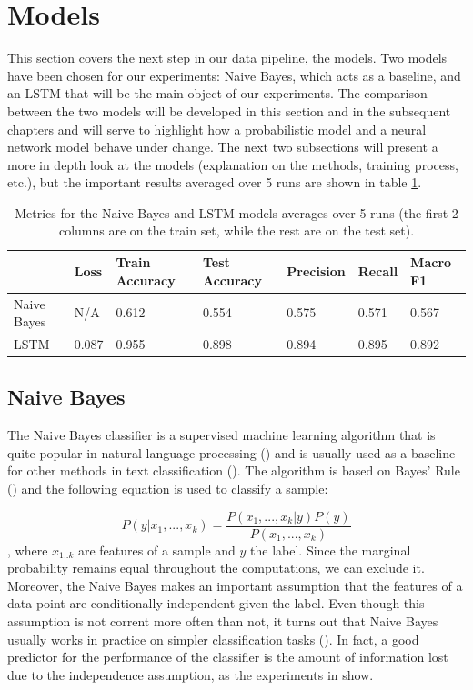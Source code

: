 \documentclass[12pt]{extreport}
\begin{document}
\section{Models} \label{sec:models}

This section covers the next step in our data pipeline, the models. Two models have been chosen for our experiments: Naive Bayes, which acts as a baseline, and an LSTM that will be the main object of our experiments. The comparison between the two models will be developed in this section and in the subsequent chapters and will serve to highlight how a probabilistic model and a neural network model behave under change. The next two subsections will present a more in depth look at the models (explanation on the methods, training process, etc.), but the important results averaged over 5 runs are shown in table \ref{table:model-metrics}.

\begin{table}[ht!]
\centering
\begin{tabular}{|l|l|l|l|l|l|l|}
\hline
            & Loss & Train Accuracy & Test Accuracy & Precision & Recall & Macro F1 \\ \hline
Naive Bayes & N/A        & 0.612          & 0.554         & 0.575          & 0.571       & 0.567         \\ \hline
LSTM        & 0.087      & 0.955          & 0.898         & 0.894          & 0.895       & 0.892         \\ \hline
\end{tabular}
\caption{Metrics for the Naive Bayes and LSTM models averages over 5 runs (the first 2 columns are on the train set, while the rest are on the test set).}
\label{table:model-metrics}
\end{table}

\subsection{Naive Bayes} \label{sec:nb}

The Naive Bayes classifier is a supervised machine learning algorithm that is quite popular in natural language processing (\cite{naivebayes}) and is usually used as a baseline for other methods in text classification (\cite{nb-baseline}). The algorithm is based on Bayes' Rule (\cite{bayesrule}) and the following equation is used to classify a sample:

\begin{equation}
    P(y|x_1, ..., x_k) = \frac{P(x_1, ..., x_k|y)P(y)}{P(x_1, ..., x_k)}
\end{equation}
, where $x_{1..k}$ are features of a sample and $y$ the label. Since the marginal probability remains equal throughout the computations, we can exclude it. Moreover, the Naive Bayes makes an important assumption that the features of a data point are conditionally independent given the label. Even though this assumption is not corrent more often than not, it turns out that Naive Bayes usually works in practice on simpler classification tasks (\cite{naivebayes}). In fact, a good predictor for the performance of the classifier is the amount of information lost due to the independence assumption, as the experiments in \cite{naivebayes} show.
\end{document}
